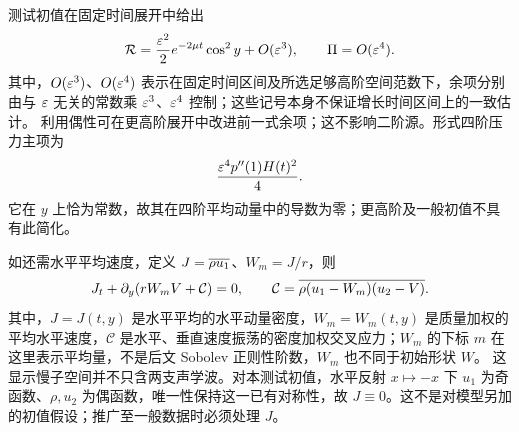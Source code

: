 测试初值在固定时间展开中给出
\[
 \mathcal R=\frac{\varepsilon^2}{2}e^{-2\mu t}\cos^2y+O(\varepsilon^3),\qquad
 \Pi=O(\varepsilon^4).
\]
其中，$O(\varepsilon^3)$、$O(\varepsilon^4)$ 表示在固定时间区间及所选足够高阶空间范数下，余项分别由与 $\varepsilon$ 无关的常数乘 $\varepsilon^3$、$\varepsilon^4$ 控制；这些记号本身不保证增长时间区间上的一致估计。
利用偶性可在更高阶展开中改进前一式余项；这不影响二阶源。形式四阶压力主项为
\[
 \frac{\varepsilon^4p''(1)H(t)^2}{4}.
\]
它在 $y$ 上恰为常数，故其在四阶平均动量中的导数为零；更高阶及一般初值不具有此简化。

如还需水平平均速度，定义 $J=\overline{\rho u_1}$、$W_m=J/r$，则
\[
 J_t+\partial_y(rW_mV+\mathcal C)=0,\qquad
 \mathcal C=\overline{\rho(u_1-W_m)(u_2-V)}.
\]
其中，$J=J(t,y)$ 是水平平均的水平动量密度，$W_m=W_m(t,y)$ 是质量加权的平均水平速度，$\mathcal C$ 是水平、垂直速度振荡的密度加权交叉应力；$W_m$ 的下标 $m$ 在这里表示平均量，不是后文 Sobolev 正则性阶数，$W_m$ 也不同于初始形状 $W$。
这显示慢子空间并不只含两支声学波。对本测试初值，水平反射 $x\mapsto-x$ 下 $u_1$ 为奇函数、$\rho,u_2$ 为偶函数，唯一性保持这一已有对称性，故 $J\equiv0$。这不是对模型另加的初值假设；推广至一般数据时必须处理 $J$。


